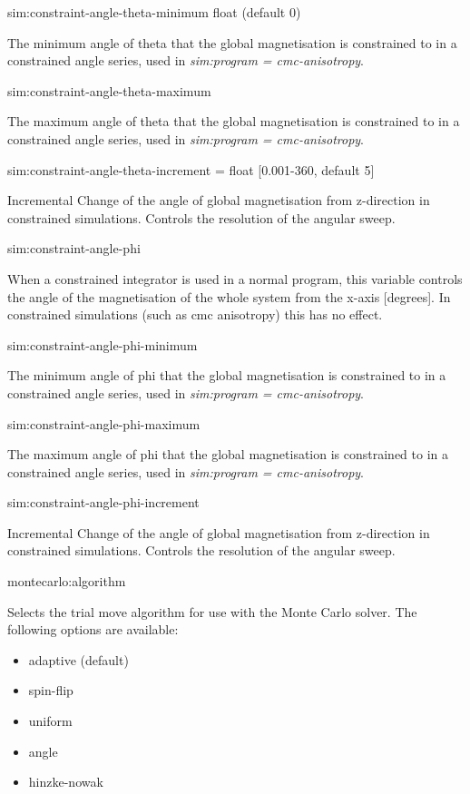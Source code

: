 {\zicf  sim:constraint-angle-theta-minimum float (default 0)}   The minimum angle of theta that the global magnetisation is constrained to in a constrained angle series, used in \textit{sim:program = cmc-anisotropy}.

{\zicf  sim:constraint-angle-theta-maximum} The maximum angle of theta that the global magnetisation is constrained to in a constrained angle series, used in \textit{sim:program = cmc-anisotropy}.

{\zicf  sim:constraint-angle-theta-increment = float [0.001-360, default 5]} Incremental Change of the angle of global magnetisation from z-direction in constrained simulations. Controls the resolution of the angular sweep.

{\zicf sim:constraint-angle-phi} When a constrained integrator is used in a normal program, this variable controls the angle of the magnetisation of the whole system from the x-axis [degrees]. In constrained simulations (such as cmc anisotropy) this has no effect.

{\zicf sim:constraint-angle-phi-minimum} The minimum angle of phi that the global magnetisation is constrained to in a constrained angle series, used in \textit{sim:program = cmc-anisotropy}.

{\zicf sim:constraint-angle-phi-maximum} The maximum angle of phi that the global magnetisation is constrained to in a constrained angle series, used in \textit{sim:program = cmc-anisotropy}.

{\zicf sim:constraint-angle-phi-increment} Incremental Change of the angle of global magnetisation from z-direction in constrained simulations. Controls the resolution of the angular sweep.

{\zicf montecarlo:algorithm}
Selects the trial move algorithm for use with the Monte Carlo solver. The
following options are available:

\begin{itemize}
  \item[] adaptive (default)
  \item[] spin-flip
  \item[] uniform
  \item[] angle
  \item[] hinzke-nowak
\end{itemize}

